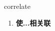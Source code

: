 
\begin{frame}
{\huge correlate}
\begin{center}
\begin{enumerate}\Large
  \item \textbf{使...相关联}
\end{enumerate}
\end{center}
\end{frame}
